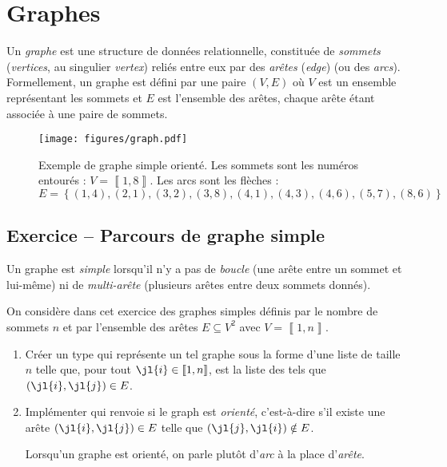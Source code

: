 \documentclass{article}
\newcounter{loop}
\newcounter{numEx}
\newcommand{\exo}[1]{
	\stepcounter{numEx}
	\setcounter{loop}{0}
	\subsection*{Exercice \arabic{numEx} -- #1}
}
\newcommand{\llbra}{\left\llbracket}
\newcommand{\rrbra}{\right\rrbracket}
\renewcommand{\brack}[1]{\ensuremath{\llbra#1\rrbra}}
\begin{document}
\section{Graphes}

Un \emph{graphe} est une structure de données relationnelle, constituée de \emph{sommets} (\textit{vertices}, au singulier \textit{vertex}) reliés entre eux par des \emph{arêtes} (\textit{edge}) (ou des \emph{arcs}). Formellement, un graphe est défini par une paire $(V, E)$ où $V$ est un ensemble représentant les sommets et $E$ est l'ensemble des arêtes, chaque arête étant associée à une paire de sommets.

\begin{figure}[bh]
	\centering
	\texttt{[image: figures/graph.pdf]}
	\caption{Exemple de graphe simple orienté. Les sommets sont les numéros entourés : $V = \brack{1,8}$. Les arcs sont les flèches : $E = \left\{(1,4), (2, 1), (3, 2), (3, 8), (4, 1), (4, 3), (4, 6), (5, 7), (8, 6)\right\}$}
\end{figure}

\exo{Parcours de graphe simple}

Un graphe est \emph{simple} lorsqu'il n'y a pas de \emph{boucle} (une arête entre un sommet et lui-même) ni de \emph{multi-arête} (plusieurs arêtes entre deux sommets donnés).

On considère dans cet exercice des graphes simples définis par le nombre de sommets $n$ et par l'ensemble des arêtes $E\subseteq V^2$ avec $V = \brack{1,n}$.

\begin{enumerate}
	\item Créer un type  qui représente un tel graphe sous la forme d'une liste  de taille $n$ telle que, pour tout $\jl{i}\in\brack{1,n}$,  est la liste des  tels que $(\jl{i},\jl{j})\in E$.



	\item Implémenter  qui renvoie  si le graph est \emph{orienté}, c'est-à-dire s'il existe une arête $(\jl{i},\jl{j})\in E$ telle que $(\jl{j},\jl{i})\notin E$.

	Lorsqu'un graphe est orienté, on parle plutôt d'\emph{arc} à la place d'\emph{arête}.
\end{enumerate}
\end{document}

